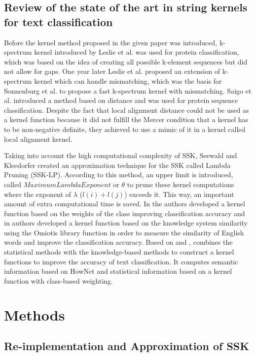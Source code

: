 \documentclass{article}
\begin{document}
\FloatBarrier
\subsection{Review of the state of the art in string kernels for text classification}

Before the kernel method proposed in the given paper was introduced, k-spectrum kernel introduced by  Leslie et al.\cite{2} was used for protein classification, which was based on the idea of creating all possible k-element sequences but did not allow for gaps. One year later Leslie et al.\cite{3} proposed an extension of k-spectrum kernel which can handle mismatching, which was the basis for Sonnenburg et al.\cite{4} to propose a fast k-spectrum kernel with mismatching. Saigo et al.\cite{5} introduced a method based on distance and was used for protein sequence classification. Despite the fact that local alignment distance could not be used as a kernel function because it did not fulfill the Mercer condition that a kernel has to be non-negative definite, they achieved to use a mimic of it in a kernel called local alignment kernel.

Taking into account the high computational complexity of SSK, Seewald and Kleedorfer\cite{6} created an approximation technique for the SSK called Lambda Pruning (SSK-LP). According to this method, an upper limit is introduced, called $Maximum Lambda Exponent$ or $\theta$ to prune these kernel computations where the exponent of $\lambda$ ($l(i)+l(j)$) exceeds it. This way, an important amount of extra computational time is saved. In \cite{7} the authors developed a kernel function based on the weights of the class improving classification accuracy and in \cite{8} authors developed a kernel function based on the knowledge system similarity using the Omiotis library function in order to measure the similarity of English words and improve the classification accuracy. Based on \cite{7} and \cite{8}, \cite{9} combines the statistical methods with the knowledge-based methods to construct a kernel functions to improve the accuracy of text classification. It computes semantic information based on HowNet and statistical information based on a kernel function with class-based weighting.

\FloatBarrier
\section{Methods}
\subsection{Re-implementation and Approximation of SSK}
\end{document}
